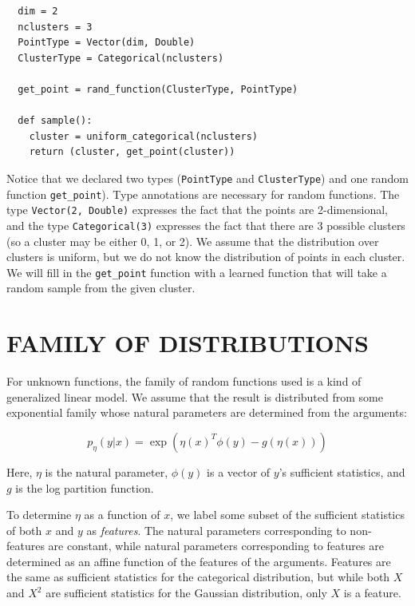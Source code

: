 \documentclass{article}
\begin{document}
  \begin{verbatim}
  dim = 2
  nclusters = 3
  PointType = Vector(dim, Double)
  ClusterType = Categorical(nclusters)

  get_point = rand_function(ClusterType, PointType)

  def sample():
    cluster = uniform_categorical(nclusters)
    return (cluster, get_point(cluster))
  \end{verbatim}

  Notice that we declared two types (\texttt{PointType} and \texttt{ClusterType})
  and one random function \texttt{get\_point}).
  Type annotations are necessary for random functions.  The type
  \texttt{Vector(2, Double)} expresses the fact that the points are 2-dimensional,
  and the type \texttt{Categorical(3)} expresses the fact that there are 3
  possible clusters (so a cluster may be either 0, 1, or 2).  We assume that
  the distribution over clusters is uniform, but we do not know the distribution
  of points in each cluster.
  We will fill in the
  \texttt{get\_point} function with a learned function that will take a random
  sample from the given cluster.

  \section{FAMILY OF DISTRIBUTIONS}
  
  For unknown functions, the family of random functions used is a kind
    of generalized linear model.  We assume that the result
    is distributed from some exponential family whose natural
    parameters are determined from the arguments:

    $$p_{\eta}(y | x) = \exp\left(\eta(x)^T \phi(y) - g(\eta(x))\right)$$

    Here, $\eta$ is the natural parameter, $\phi(y)$ is a vector of $y$'s sufficient statistics,
    and $g$ is the log partition function.

    To determine $\eta$ as a function of $x$, we label
    some subset of the sufficient statistics of both $x$ and $y$ as \emph{features}.  The natural
    parameters corresponding to non-features are constant, while natural
    parameters corresponding to features are determined as an affine
    function of the features of the arguments.  Features are the same as sufficient
    statistics for the categorical distribution, but while both $X$ and $X^2$ are
    sufficient statistics for the Gaussian distribution, only $X$ is a feature.
\end{document}
